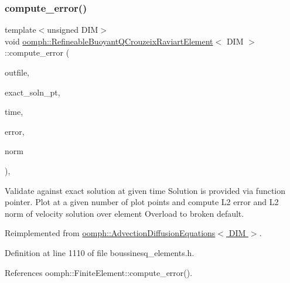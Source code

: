 \subsubsection{\texorpdfstring{compute\+\_\+error()}{compute\_error()}\hspace{0.1cm}{\footnotesize\ttfamily [1/2]}}
{\footnotesize\ttfamily template$<$unsigned D\+IM$>$ \\
void \hyperlink{classoomph_1_1RefineableBuoyantQCrouzeixRaviartElement}{oomph\+::\+Refineable\+Buoyant\+Q\+Crouzeix\+Raviart\+Element}$<$ D\+IM $>$\+::compute\+\_\+error (\begin{DoxyParamCaption}\item[{std\+::ostream \&}]{outfile,  }\item[{\hyperlink{classoomph_1_1FiniteElement_ad4ecf2b61b158a4b4d351a60d23c633e}{Finite\+Element\+::\+Unsteady\+Exact\+Solution\+Fct\+Pt}}]{exact\+\_\+soln\+\_\+pt,  }\item[{const double \&}]{time,  }\item[{double \&}]{error,  }\item[{double \&}]{norm }\end{DoxyParamCaption})\hspace{0.3cm}{\ttfamily [inline]}, {\ttfamily [virtual]}}



Validate against exact solution at given time Solution is provided via function pointer. Plot at a given number of plot points and compute L2 error and L2 norm of velocity solution over element Overload to broken default. 



Reimplemented from \hyperlink{classoomph_1_1AdvectionDiffusionEquations_a87c8c4e8ff5ea6e6dcb243ec83bb4fd2}{oomph\+::\+Advection\+Diffusion\+Equations$<$ D\+I\+M $>$}.



Definition at line 1110 of file boussinesq\+\_\+elements.\+h.



References oomph\+::\+Finite\+Element\+::compute\+\_\+error().

\mbox{\label{classoomph_1_1RefineableBuoyantQCrouzeixRaviartElement_a078039343f5f9bb467a1183f725d1873}} 
